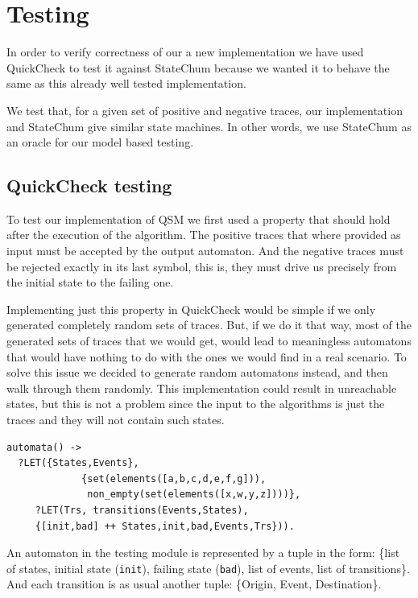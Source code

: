 \documentclass[]{sigplanconf}
\begin{document}
\section{Testing}
\label{testing}

In order to verify correctness of our a new implementation
we have used QuickCheck to test it against StateChum \cite{statechum}
because we wanted it to behave the same as this already well tested
implementation.

We test that, for a given set of positive and negative traces,
our implementation and StateChum give similar state machines.
In other words, we use StateChum as an oracle for our model based testing.

\subsection{QuickCheck testing}

To test our implementation of QSM we first used a property
that should hold after the execution of the algorithm. The positive
traces that where provided as input must be accepted by the output
automaton. And the negative traces must be rejected exactly in its
last symbol, this is, they must drive us precisely from the initial
state to the failing one.

Implementing just this property in QuickCheck would be simple if we only
generated completely random sets of traces. But, if we do it that way,
most of the generated sets of traces that we would get, would lead to
meaningless automatons that would have nothing to do with the ones we
would find in a real scenario. To solve this issue we decided to
generate random automatons instead, and then walk through them randomly.
This implementation could result in unreachable states, but this is not
a problem since the input to the algorithms is just the traces and they
will not contain such states.

\begin{verbatim}
automata() ->
  ?LET({States,Events}, 
             {set(elements([a,b,c,d,e,f,g])),
              non_empty(set(elements([x,w,y,z])))},
     ?LET(Trs, transitions(Events,States),
     {[init,bad] ++ States,init,bad,Events,Trs})).
\end{verbatim}

An automaton in the testing module is represented by a tuple in the form:
\{list of states, initial state (\texttt{init}), failing state
(\texttt{bad}), list of events, list of transitions\}. And each
transition is as usual another tuple:
\{Origin, Event, Destination\}.
\end{document}
